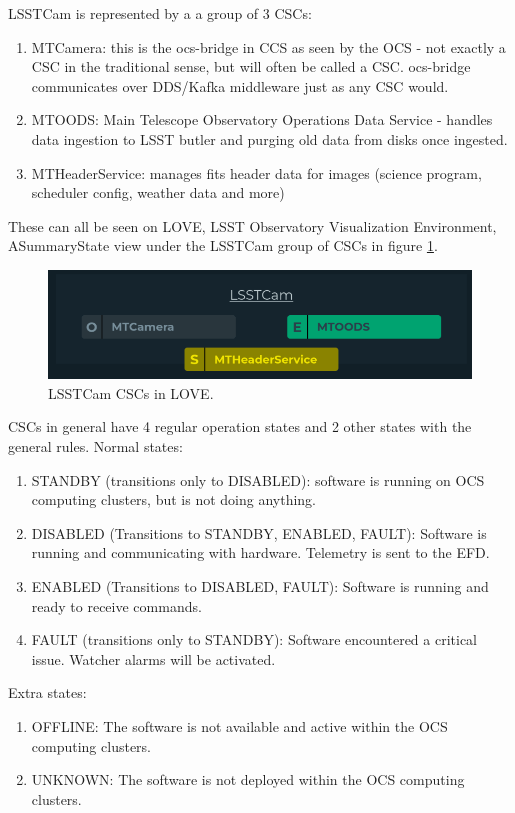 LSSTCam is represented by a a group of 3 CSCs:
\begin{enumerate}
    \item MTCamera: this is the ocs-bridge in CCS as seen by the OCS - not exactly a CSC in the traditional sense, but will often be called a CSC. ocs-bridge communicates over DDS/Kafka middleware just as any CSC would.
    \item MTOODS: Main Telescope Observatory Operations Data Service - handles data ingestion to LSST butler and purging old data from disks once ingested.
    \item MTHeaderService: manages fits header data for images (science program, scheduler config, weather data and more)
\end{enumerate}

These can all be seen on LOVE, LSST Observatory Visualization Environment, ASummaryState view under the LSSTCam group of CSCs in figure \ref{fig:app:lsstcamcsc}.
\begin{figure}
    \centering
    \includegraphics[width=0.6\linewidth]{figures/appendixFigs/lsstcamcsc.png}
    \caption{LSSTCam CSCs in LOVE.}
    \label{fig:app:lsstcamcsc}
\end{figure}

CSCs in general have 4 regular operation states and 2 other states with the general rules. Normal states:
\begin{enumerate}
    \item STANDBY (transitions only to DISABLED): software is running on OCS computing clusters, but is not doing anything.
    \item DISABLED (Transitions to STANDBY, ENABLED, FAULT): Software is running and communicating with hardware. Telemetry is sent to the EFD.
    \item ENABLED (Transitions to DISABLED, FAULT): Software is running and ready to receive commands.
    \item FAULT (transitions only to STANDBY): Software encountered a critical issue. Watcher alarms will be activated.
\end{enumerate}
Extra states:
\begin{enumerate}
    \item OFFLINE: The software is not available and active within the OCS computing clusters. 
    \item UNKNOWN: The software is not deployed within the OCS computing clusters. 
\end{enumerate}

